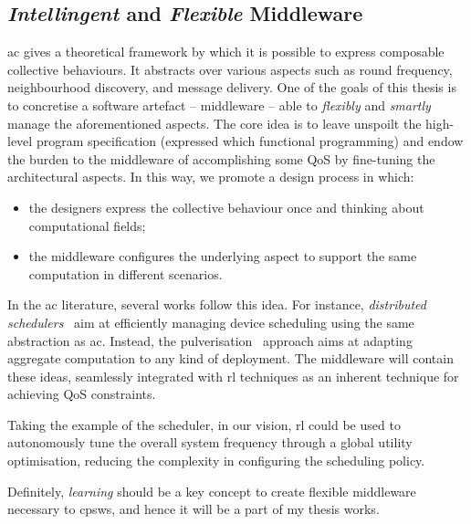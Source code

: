 \documentclass[11pt]{article}
\begin{document}
\subsection{\emph{Intellingent} and \emph{Flexible} Middleware}\label{middleware}
\ac{ac} gives a theoretical framework by which it is possible to express composable collective behaviours. It abstracts over various aspects such as round frequency, neighbourhood discovery, and message delivery.
One of the goals of this thesis is to concretise a software artefact -- middleware -- able to \emph{flexibly} and \emph{smartly} manage the aforementioned aspects.
%
The core idea is to leave unspoilt the high-level program specification (expressed which functional programming) and endow the burden to the middleware of accomplishing some QoS by fine-tuning the architectural aspects. 
%
In this way, we promote a design process in which:
\begin{itemize}
	\item the designers express the collective behaviour once and thinking about computational fields;
	\item the middleware configures the underlying aspect to support the same computation in different scenarios.
\end{itemize}

In the \ac{ac} literature, several works follow this idea. 
%
For instance, \emph{distributed schedulers}~\cite{DBLP:journals/corr/abs-2012-13806} aim at efficiently managing device scheduling using the same abstraction as \ac{ac}.
Instead, the pulverisation~\cite{DBLP:journals/fi/CasadeiPPVW20} approach aims at adapting aggregate computation to any kind of deployment.
%
The middleware will contain these ideas, seamlessly integrated with \ac{rl} techniques as an inherent technique for achieving  QoS constraints.

Taking the example of the scheduler, in our vision, \ac{rl} could be used to autonomously tune the overall system frequency through a global utility optimisation, reducing the complexity in configuring the scheduling policy.

Definitely, \emph{learning} should be a key concept to create flexible middleware necessary to \acp{cpsw}, and hence it will be a part of my thesis works. 



\end{document}
